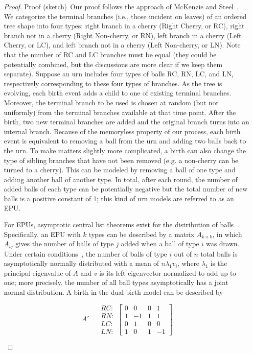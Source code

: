 \begin{proof}{Proof (sketch)}\
Our proof follows the approach of McKenzie and Steel~\cite{McKenzie2000}. We categorize the terminal branches (i.e., those incident on leaves) of an ordered tree shape into four types: right branch in a cherry (Right Cherry, or RC), right branch not in a cherry (Right Non-cherry, or RN), left branch in a cherry (Left Cherry, or LC), and left branch not in a cherry (Left Non-cherry, or LN). Note that the number of RC and LC branches must be equal (they could be potentially combined, but the discussions are more clear if we keep them separate). Suppose an urn includes four types of balls RC, RN, LC, and LN, respectively corresponding to these four types of branches. As the tree is evolving, each birth event adds a child to one of existing terminal branches. Moreover, the terminal branch to be used is chosen at random (but not uniformly) from the terminal branches available at that time point. After the birth, two new terminal branches are added and the original branch turns into an internal branch. Because of the memoryless property of our process, each birth event is equivalent to removing a ball from the urn and adding two balls back to the urn. To make matters slightly more complicated, a birth can also change the type of sibling branches that have not been removed (e.g. a non-cherry can be turned to a cherry). This can be modeled by removing a ball of one type and adding another ball of another type. In total, after each round, the number of added balls of each type can be potentially negative but the total number of new balls is a positive constant of 1; this kind of urn models are referred to as an \gls{EPU}.

For \glspl{EPU}, asymptotic central list theorems exist for the distribution of balls~\cite{Smythe1996}. Specifically, an \gls{EPU} with $k$ types can be described by a matrix $A_{k\times k}$, in which $A_{ij}$ gives the number of balls of type $j$ added when a ball of type $i$ was drawn. Under certain conditions~\cite{Smythe1996}, the number of balls of type $i$ out of $n$ total balls is asymptotically normally distributed with a mean of $n\lambda_1 v_i$, where $\lambda_1$ is the principal eigenvalue of $A$ and $v$ is its left eigenvector normalized to add up to one; more precisely, the number of all ball types asymptotically has a joint normal distribution. A birth in the dual-birth model can be described by
\begin{small}
$$
A'= 
\begin{matrix} 
RC: \\
RN: \\
LC: \\
LN:
\end{matrix}
\begin{bmatrix} 
0& 0&  0& 1 \\
1& -1&  1& 1 \\
0& 1&  0& 0 \\
1& 0&  1& -1 
\end{bmatrix}
$$ 
\end{small}


\end{proof}
